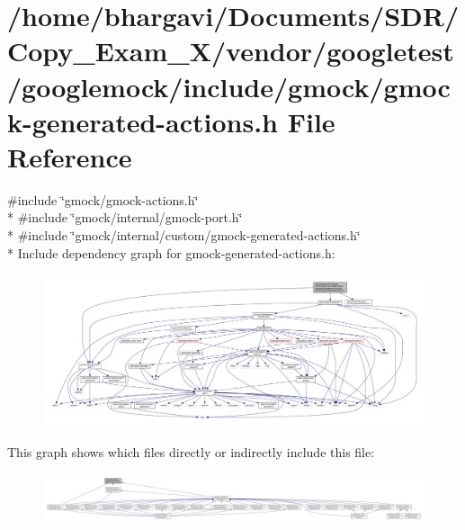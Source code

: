 \hypertarget{gmock-generated-actions_8h}{}\section{/home/bhargavi/\+Documents/\+S\+D\+R/\+Copy\+\_\+\+Exam\+\_\+X/vendor/googletest/googlemock/include/gmock/gmock-\/generated-\/actions.h File Reference}
\label{gmock-generated-actions_8h}
{\ttfamily \#include \char`\"{}gmock/gmock-\/actions.\+h\char`\"{}}\\*
{\ttfamily \#include \char`\"{}gmock/internal/gmock-\/port.\+h\char`\"{}}\\*
{\ttfamily \#include \char`\"{}gmock/internal/custom/gmock-\/generated-\/actions.\+h\char`\"{}}\\*
Include dependency graph for gmock-\/generated-\/actions.h\+:
\nopagebreak
\begin{figure}[H]
\begin{center}
\leavevmode
\includegraphics[width=350pt]{gmock-generated-actions_8h__incl}
\end{center}
\end{figure}
This graph shows which files directly or indirectly include this file\+:
\nopagebreak
\begin{figure}[H]
\begin{center}
\leavevmode
\includegraphics[width=350pt]{gmock-generated-actions_8h__dep__incl}
\end{center}
\end{figure}
